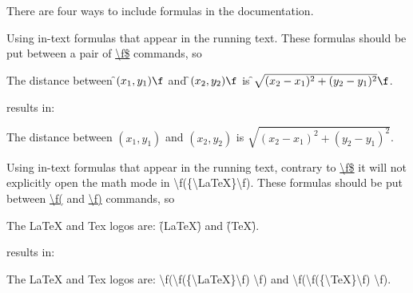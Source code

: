 There are four ways to include formulas in the documentation. 
\begin{DoxyEnumerate}
\item Using in-\/text formulas that appear in the running text. These formulas should be put between a pair of \mbox{\hyperlink{commands_cmdfdollar}{\textbackslash{}f\$}} commands, so \begin{DoxyVerb}  The distance between \f$(x_1,y_1)\f$ and \f$(x_2,y_2)\f$ is 
  \f$\sqrt{(x_2-x_1)^2+(y_2-y_1)^2}\f$.
\end{DoxyVerb}
 results in\+:

The distance between $(x_1,y_1)$ and $(x_2,y_2)$ is $\sqrt{(x_2-x_1)^2+(y_2-y_1)^2}$. ~\newline
 
\item Using in-\/text formulas that appear in the running text, contrary to \mbox{\hyperlink{commands_cmdfdollar}{\textbackslash{}f\$}} it will not explicitly open the math mode in \textbackslash{}f(\{\textbackslash{}\+La\+TeX\}\textbackslash{}f). These formulas should be put between \mbox{\hyperlink{commands_cmdfrndclose}{\textbackslash{}f(}} and \mbox{\hyperlink{commands_cmdfrndopen}{\textbackslash{}f)}} commands, so \begin{DoxyVerb}  The LaTeX and Tex logos are: \f(\LaTeX \f) and \f(\TeX \f).
\end{DoxyVerb}
 results in\+:

The La\+TeX and Tex logos are\+: \textbackslash{}f(\textbackslash{}f(\{\textbackslash{}\+La\+TeX\}\textbackslash{}f) \textbackslash{}f) and \textbackslash{}f(\textbackslash{}f(\{\textbackslash{}\+TeX\}\textbackslash{}f) \textbackslash{}f). ~\newline
 

\end{DoxyEnumerate}

